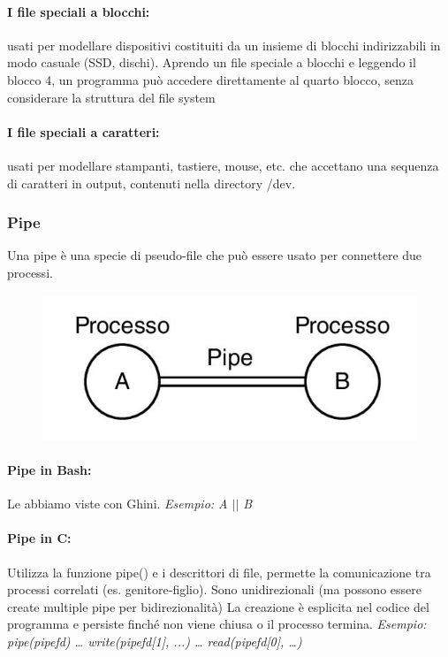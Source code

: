 \paragraph{I file speciali a blocchi:}
usati per modellare dispositivi costituiti da un insieme di blocchi indirizzabili in modo casuale (SSD, dischi). Aprendo un file speciale a blocchi e leggendo il blocco 4, un programma può accedere direttamente al quarto blocco, senza considerare la struttura del file system
\paragraph{I file speciali a caratteri:}
usati per modellare stampanti, tastiere, mouse, etc. che accettano una sequenza di caratteri in output, contenuti nella directory /dev.

\subsubsection{Pipe}
Una pipe è una specie di pseudo-file che può essere usato per
connettere due processi.
\begin{figure}[h]
    \centering
    \includegraphics[width=0.4\linewidth]{Images/Screenshot 2024-12-18 at 13-24-07 so-01-intro-os.pptx - so-01-intro-os.pdf.png}
    \label{fig:enter-label}
\end{figure}

\paragraph{Pipe in Bash:} Le abbiamo viste con Ghini.
\textit{Esempio: A $||$ B}

\paragraph{Pipe in C:} Utilizza la funzione pipe() e i descrittori di file, permette la comunicazione tra processi correlati (es. genitore-figlio). Sono unidirezionali (ma possono essere create multiple pipe per bidirezionalità)
La creazione è esplicita nel codice del programma e persiste finché non viene chiusa o il processo termina.
\textit{Esempio:
pipe(pipefd)
… write(pipefd[1], ...)
… read(pipefd[0], …)}
